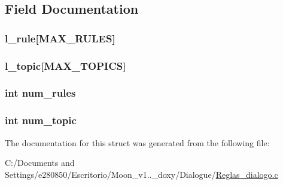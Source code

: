 \subsection{Field Documentation}
\hypertarget{struct___dialogue_rules_adcfc73729bed816be4039aa0ce11ad84}{
\subsubsection[{l\+\_\+rule}]{ l\+\_\+rule\mbox{[}{\bf M\+A\+X\+\_\+\+R\+U\+L\+E\+S}\mbox{]}}}\label{struct___dialogue_rules_adcfc73729bed816be4039aa0ce11ad84}
\hypertarget{struct___dialogue_rules_a213a0f2b7a6e5708697a56b1500eb98d}{
\subsubsection[{l\+\_\+topic}]{ l\+\_\+topic\mbox{[}{\bf M\+A\+X\+\_\+\+T\+O\+P\+I\+C\+S}\mbox{]}}}\label{struct___dialogue_rules_a213a0f2b7a6e5708697a56b1500eb98d}
\hypertarget{struct___dialogue_rules_aa53169e27c9b915a8e6d9b9bda375702}{
\subsubsection[{num\+\_\+rules}]{\setlength{\rightskip}{0pt plus 5cm}int num\+\_\+rules}}\label{struct___dialogue_rules_aa53169e27c9b915a8e6d9b9bda375702}
\hypertarget{struct___dialogue_rules_a8754a41ef66790df944ae9b6081fedde}{
\subsubsection[{num\+\_\+topic}]{\setlength{\rightskip}{0pt plus 5cm}int num\+\_\+topic}}\label{struct___dialogue_rules_a8754a41ef66790df944ae9b6081fedde}


The documentation for this struct was generated from the following file\+:\begin{DoxyCompactItemize}
\item 
C\+:/\+Documents and Settings/e280850/\+Escritorio/\+Moon\+\_\+v1..\+\_\+doxy/\+Dialogue/\hyperlink{_reglas__dialogo_8c}{Reglas\+\_\+dialogo.\+c}\end{DoxyCompactItemize}
